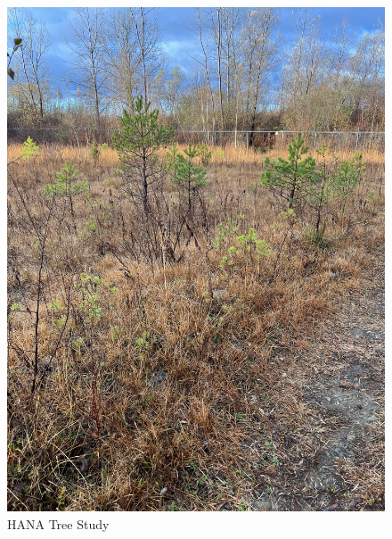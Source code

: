 \documentclass{article}
\begin{document}
\begin{figure}[h!]
\centering
\includegraphics[scale=.1]{Research/HANA/NOV2024/IMG_9820.JPG}
\caption{HANA Tree Study}
\label{fig:HANA}
\end{figure}
\end{document}
